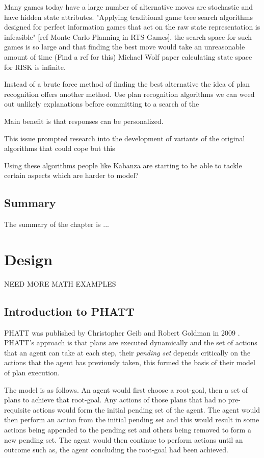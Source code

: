 \documentclass[parskip]{cs4rep}
\begin{document}
Many games today have a large number of alternative moves are stochastic and have hidden state attributes. "Applying traditional game tree search algorithms designed for perfect information games that act on the raw state representation is infeasible" [ref Monte Carlo Planning in RTS Games], the search space for such games is so large and that finding the best move would take an unreasonable amount of time (Find a ref for this) Michael Wolf paper calculating state space for RISK is infinite.

Instead of a brute force method of finding the best alternative the idea of plan recognition offers another method. Use plan recognition algorithms we can weed out unlikely explanations before committing to a search of the 

Main benefit is that responses can be personalized.

This issue prompted research into the development of variants of the original algorithms that could cope but this 

Using these algorithms people like Kabanza are starting to be able to tackle certain aspects which are harder to model?

\section{Summary}

The summary of the chapter is ...

\chapter{Design}

NEED MORE MATH EXAMPLES

\section{Introduction to PHATT}

PHATT was published by Christopher Geib and Robert Goldman in 2009 \cite{Geib:2009:PPR:1550966.1551246}. PHATT's approach is that plans are executed dynamically and the set of actions that an agent can take at each step, their \textit{pending set} depends critically on the actions that the agent has previously taken, this formed the basis of their model of plan execution.

The model is as follows. An agent would first choose a root-goal, then a set of plans to achieve that root-goal. Any actions of those plans that had no pre-requisite actions would form the initial pending set of the agent. The agent would then perform an action from the initial pending set and this would result in some actions being appended to the pending set and others being removed to form a new pending set. The agent would then continue to perform actions until an outcome such as, the agent concluding the root-goal had been achieved.
\end{document}
